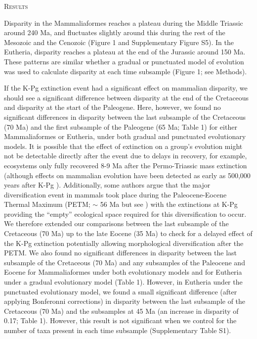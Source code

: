 \documentclass[12pt,letterpaper]{article}
\renewcommand{\section}[1]{%
\bigskip
\begin{center}
\begin{Large}
\normalfont\scshape #1
\medskip
\end{Large}
\end{center}}
\begin{document}
%
%

\section{Results}
Disparity in the Mammaliaformes reaches a plateau during the Middle Triassic around 240 Ma, and fluctuates slightly around this during the rest of the Mesozoic and the Cenozoic (Figure 1 and Supplementary Figure S5).
In the Eutheria, disparity reaches a plateau at the end of the Jurassic around 150 Ma.
These patterns are similar whether a gradual or punctuated model of evolution was used to calculate disparity at each time subsample (Figure 1; see Methods).

If the K-Pg extinction event had a significant effect on mammalian disparity, we should see a significant difference between disparity at the end of the Cretaceous and disparity at the start of the Paleogene.
Here, however, we found no significant differences in disparity between the last subsample of the Cretaceous (70 Ma) and the first subsample of the Paleogene (65 Ma; Table 1) for either Mammaliaformes or Eutheria, under both gradual and punctuated evolutionary models. 
It is possible that the effect of extinction on a group's evolution might not be detectable directly after the event due to delays in recovery, for example, ecosystems only fully recovered 8-9 Ma after the Permo-Triassic mass extinction \cite{chen2012timing} (although effects on mammalian evolution have been detected as early as 500,000 years after K-Pg \cite{Wilson2013}).
Additionally, some authors argue that the major diversification event in mammals took place during the Paleocene-Eocene Thermal Maximum (PETM; $\sim$ 56 Ma \cite{bininda2007delayed} but see \cite{meredithimpacts2011,Stadler12042011}) with the extinctions at K-Pg providing the ``empty'' ecological space required for this diversification to occur.
We therefore extended our comparisons between the last subsample of the Cretaceous (70 Ma) up to the late Eocene (35 Ma) to check for a delayed effect of the K-Pg extinction potentially allowing morphological diversification after the PETM. 
We also found no significant differences in disparity between the last subsample of the Cretaceous (70 Ma) and any subsamples of the Paleocene and Eocene for Mammaliaformes under both evolutionary models and for Eutheria under a gradual evolutionary model (Table 1).
However, in Eutheria under the punctuated evolutionary model, we found a small significant difference (after applying Bonferonni corrections) in disparity between the last subsample of the Cretaceous (70 Ma) and the subsamples at 45 Ma (an increase in disparity of 0.17; Table 1).
However, this result is not significant when we control for the number of taxa present in each time subsample (Supplementary Table S1). 
\end{document}
